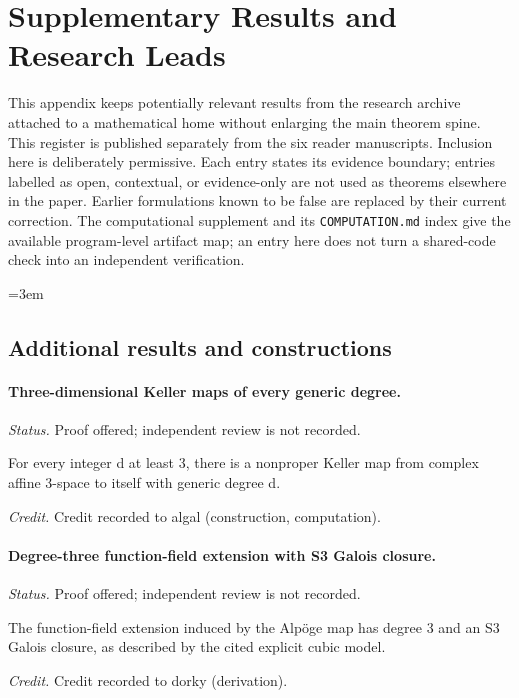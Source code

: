 \section{Supplementary Results and Research Leads}
\label{app:supplementary-register-01}

This appendix keeps potentially relevant results from the research
archive attached to a mathematical home without enlarging the main
theorem spine.  This register is published separately from the six reader manuscripts.  Inclusion here is deliberately permissive.  Each entry
states its evidence boundary; entries labelled as open, contextual, or
evidence-only are not used as theorems elsewhere in the paper.  Earlier
formulations known to be false are replaced by their current correction.
The computational supplement and its \texttt{COMPUTATION.md} index give
the available program-level artifact map; an entry here does not turn a
shared-code check into an independent verification.
\begingroup\raggedright\emergencystretch=3em

\subsection{Additional results and constructions}

\label{supp-note-01-001}
\paragraph{Three-dimensional Keller maps of every generic degree.}
\emph{Status.} Proof offered; independent review is not recorded.

For every integer d at least 3, there is a nonproper Keller map from complex affine 3-space to itself with generic degree d.

\emph{Credit.} Credit recorded to algal (construction, computation).

\label{supp-note-01-002}
\paragraph{Degree-three function-field extension with S3 Galois closure.}
\emph{Status.} Proof offered; independent review is not recorded.

The function-field extension induced by the Alpöge map has degree 3 and an S3 Galois closure, as described by the cited explicit cubic model.

\emph{Credit.} Credit recorded to dorky (derivation).

